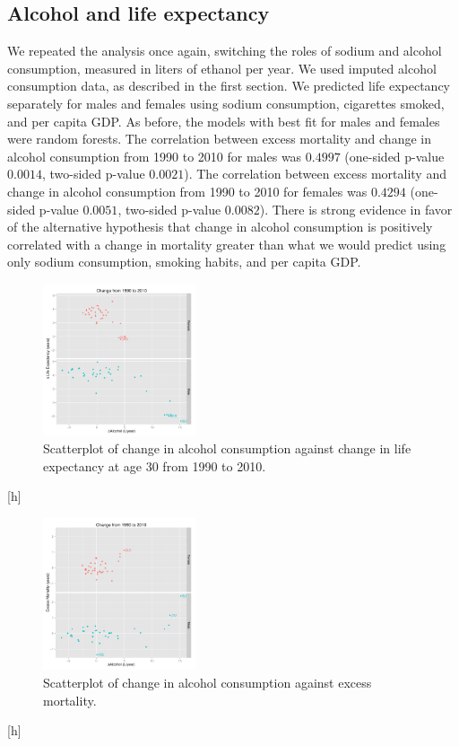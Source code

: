 \documentclass{article}
\begin{document}
\subsection{Alcohol and life expectancy}
We repeated the analysis once again, switching the roles of sodium and alcohol consumption, measured in liters of ethanol per year.  We used imputed alcohol consumption data, as described in the first section. We predicted life expectancy separately for males and females using sodium consumption, cigarettes smoked, and per capita GDP.  As before, the models with best fit for males and females were random forests.  The correlation between excess mortality and change in alcohol consumption from 1990 to 2010 for males was $0.4997$ (one-sided p-value $0.0014$, two-sided p-value $0.0021$).  The correlation between excess mortality and change in alcohol consumption from 1990 to 2010 for females was $0.4294$ (one-sided p-value $0.0051$, two-sided p-value $0.0082$).  There is strong evidence in favor of the alternative hypothesis that change in alcohol consumption is positively correlated with a change in mortality greater than what we would predict using only sodium consumption, smoking habits, and per capita GDP.


\begin{figure}[h]
\centering
\includegraphics[width = 0.4\textwidth]{etoh_lifeexp.pdf}
\caption{Scatterplot of change in alcohol consumption against change in life expectancy at age 30 from 1990 to 2010.}\label{fig:etoh_lifeexp}
\end{figure}[h]

\begin{figure}[h]
\centering
\includegraphics[width = 0.4\textwidth]{etoh_exmort.pdf}
\caption{Scatterplot of change in alcohol consumption against excess mortality.}\label{fig:etoh_excessmortality}
\end{figure}[h]
\end{document}
